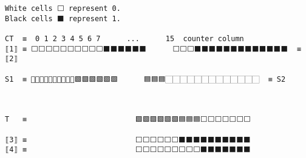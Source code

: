 \documentclass[varwidth=\maxdimen,margin=0.5cm,multi={verbatim}]{standalone}
\begin{document}
\begin{verbatim}
White cells ⬜ represent 0.
Black cells ⬛ represent 1.

CT  ≡  0 1 2 3 4 5 6 7      ...      15  counter column
⟦1⟧ ≡ ⬜⬜⬜⬜⬜⬜⬜⬜⬜⬜⬛⬛⬛⬛⬛⬛      ⬜⬜⬜⬛⬛⬛⬛⬛⬛⬛⬛⬛⬛⬛⬛⬛  ≡ ⟦2⟧  

S1  ≡ 🏻🏻🏻🏻🏻🏻🏻🏻🏻🏻🟩🟩🟩🟩🟩🟩      🟦🟦🟦🏻🏻🏻🏻🏻🏻🏻🏻🏻🏻🏻🏻🏻  ≡ S2
                                    

                                    
T   ≡                         🟩🟩🟩🟩🟩🟩🟦🟦🟦⬜⬜⬜⬜⬜⬜⬜

⟦3⟧ ≡                         ⬜⬜⬜⬜⬜⬜⬛⬛⬛⬛⬛⬛⬛⬛⬛⬛
⟦4⟧ ≡                         ⬜⬜⬜⬜⬜⬜⬜⬜⬜⬛⬛⬛⬛⬛⬛⬛
\end{verbatim}
\end{document}
